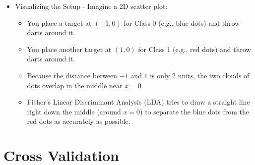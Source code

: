 \documentclass[
  letterpaper,
  DIV=11,
  numbers=noendperiod]{scrreprt}
\providecommand{\tightlist}{%
  \setlength{\itemsep}{0pt}\setlength{\parskip}{0pt}}
\begin{document}
\begin{itemize}
\begin{itemize}
    \begin{itemize}
    \tightlist
    \item
      Data points for Class 0 cluster around the point \((-1, 0)\) on
      the graph.
    \item
      Data points for Class 1 cluster around the point \((1, 0)\) on the
      graph.
    \end{itemize}
  \item
    Identity Covariance Matrix (\(\mathbf{I}\)):

    \begin{itemize}
    \tightlist
    \item
      The two features \(X_1\) and \(X_2\) are independent of each other
      (non-correlated).
    \item
      The variance (spread) is 1 in all directions.
    \item
      Plain English: The data points spread out equally in every
      direction, creating two neat, circle-shaped clouds of dots
      centered at \((-1, 0)\) and \$(1, 0
    \end{itemize}
  \end{itemize}
\item
  Visualizing the Setup - Imagine a 2D scatter plot:

  \begin{itemize}
  \tightlist
  \item
    You place a target at \((-1, 0)\) for Class 0 (e.g., blue dots) and
    throw darts around it.
  \item
    You place another target at \((1, 0)\) for Class 1 (e.g., red dots)
    and throw darts around it.
  \item
    Because the distance between \(-1\) and \(1\) is only \(2\) units,
    the two clouds of dots overlap in the middle near \(x = 0\).
  \item
    Fisher's Linear Discriminant Analysis (LDA) tries to draw a straight
    line right down the middle (around \(x = 0\)) to separate the blue
    dots from the red dots as accurately as possible.
  \end{itemize}
\end{itemize}


\chapter{Cross Validation}\label{cross-validation-1}
\end{document}
